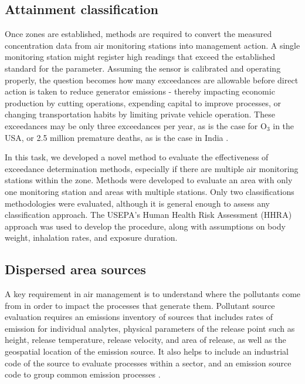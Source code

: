 \subsection{Attainment classification}

Once zones are established, methods are required to convert the measured concentration data from air monitoring stations into management action. A single monitoring station might register high readings that exceed the established standard for the parameter. Assuming the sensor is calibrated and operating properly, the question becomes how many exceedances are allowable before direct action is taken to reduce generator emissions - thereby impacting economic production by cutting operations, expending capital to improve processes, or changing transportation habits by limiting private vehicle operation. These exceedances may be only three exceedances per year, as is the case for O$_{3}$ in the USA, or 2.5 million premature deaths, as is the case in India \citep{Landrigan2017}.

In this task, we developed a novel method to evaluate the effectiveness of exceedance determination methods, especially if there are multiple air monitoring stations within the zone. Methods were developed to evaluate an area with only one monitoring station and areas with multiple stations. Only two classifications methodologies were evaluated, although it is general enough to assess any classification approach. The USEPA's Human Health Risk Assessment (HHRA) approach was used to develop the procedure, along with assumptions on body weight, inhalation rates, and exposure duration. 

\subsection{Dispersed area sources}

A key requirement in air management is to understand where the pollutants come from in order to impact the processes that generate them. Pollutant source evaluation requires an emissions inventory of sources that includes rates of emission for individual analytes, physical parameters of the release point such as height, release temperature, release velocity, and area of release, as well as the geospatial location of the emission source. It also helps to include an industrial code of the source to evaluate processes within a sector, and an emission source code to group common emission processes \citep{The2008}.

